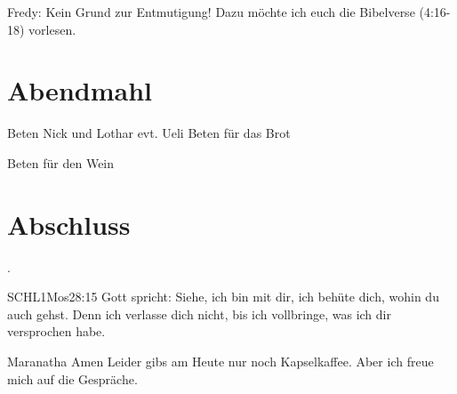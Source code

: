 \documentclass{../../inc/mybib}
\begin{document}
Fredy: Kein Grund zur Entmutigung!
Dazu möchte ich euch die Bibelverse (4:16-18) vorlesen.


 \section{Abendmahl}
 Beten Nick und Lothar evt. Ueli
 Beten für das Brot 


 Beten für den Wein


\section{Abschluss}

 .

\beten{}

\begin{bibelbox}{SCHL}{1Mos}{28:15}
    Gott spricht: Siehe, ich bin mit dir,
    ich behüte dich, wohin du auch gehst.
    Denn ich verlasse dich nicht,
    bis ich vollbringe, was ich dir versprochen habe.
\end{bibelbox}

Maranatha Amen
Leider gibs am Heute nur noch Kapselkaffee. Aber ich freue mich auf die Gespräche.
\end{document}
